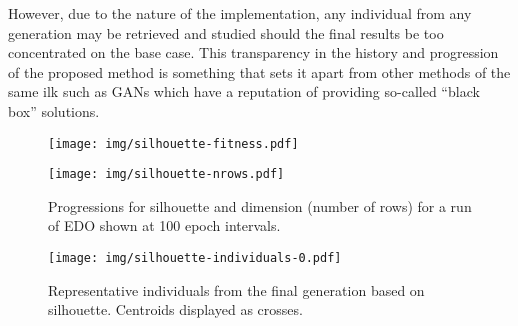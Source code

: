 However, due to the nature of the implementation, any individual from any
generation may be retrieved and studied should the final results be too
concentrated on the base case. This transparency in the history and progression
of the proposed method is something that sets it apart from other methods of the
same ilk such as GANs which have a reputation of providing so-called ``black
box'' solutions.

\begin{figure}[htbp]
    \centering
    \begin{minipage}{\imgwidth}
        \centering
        \texttt{[image: img/silhouette-fitness.pdf]}
    \end{minipage}

    \begin{minipage}{\imgwidth}
        \centering
        \texttt{[image: img/silhouette-nrows.pdf]}
    \end{minipage}
    \caption{Progressions for silhouette and dimension (number of rows) for a
             run of EDO shown at 100 epoch intervals.}\label{figure:silhouette}
\end{figure}


\begin{figure}[htbp]
    \centering
    \texttt{[image: img/silhouette-individuals-0.pdf]}
    \caption{Representative individuals from the final generation based on
             silhouette. Centroids displayed as
             crosses.}\label{figure:silhouette-individuals}
\end{figure}


